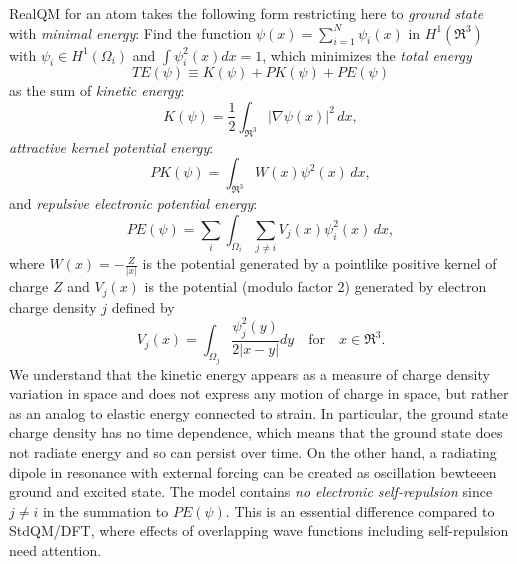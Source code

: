 \documentclass[11pt]{article} %
\begin{document}
RealQM for an atom takes the following form restricting here to \emph{ground state} with \emph{minimal energy}: Find the function $\psi (x)=\sum_{i=1}^N\psi_i(x)$ in $H^1(\Re^3)$ with $\psi_i\in H^1(\Omega_i )$ and $\int\psi_i^2(x)dx=1$,  which minimizes the \emph{total energy} 
\begin{displaymath}
TE(\psi )\equiv K(\psi )+PK(\psi )+PE(\psi )
\end{displaymath}
as the sum of \emph{kinetic energy}:
\begin{displaymath}
K(\psi )=\frac{1}{2}\int_{\Re^3}\vert\nabla\psi (x)\vert^2\, dx,
\end{displaymath}
 \emph{attractive kernel potential energy}:
\begin{displaymath}
PK(\psi )=\int_{\Re^3}W(x)\psi^2(x)\, dx,
\end{displaymath}
and \emph{repulsive electronic potential energy}:
\begin{displaymath}
PE(\psi )=\sum_i\int_{\Omega_i}\sum_{j\neq i} V_j(x)\psi_i^2(x)\, dx,
\end{displaymath}    
where $W(x)=-\frac{Z}{\vert x\vert}$ is the potential generated by a pointlike positive kernel of charge $Z$ and $V_j(x)$ is the potential (modulo factor 2) generated by electron charge density $j$ defined by 
\begin{displaymath}
V_j(x)=\int_{\Omega_j}\frac{\psi_j^2(y)}{2\vert x-y\vert}dy \quad\mbox{for}\quad x\in\Re^3.
\end{displaymath}
We understand that the kinetic energy appears as a measure of charge density variation in space and does not express any motion of charge in space,  but rather as an analog to elastic energy connected to strain.  In particular,  the ground state charge density has no time dependence,  which means that the ground state does not radiate energy and so can persist over time.  On the other hand,  a radiating dipole in resonance with external forcing can be created as oscillation bewteeen ground and excited state.  The model contains \emph{no electronic self-repulsion} since $j\neq i$ in the summation to $PE (\psi )$.  This is an essential difference compared to StdQM/DFT,  where effects of overlapping wave functions including self-repulsion need attention.
\end{document}
